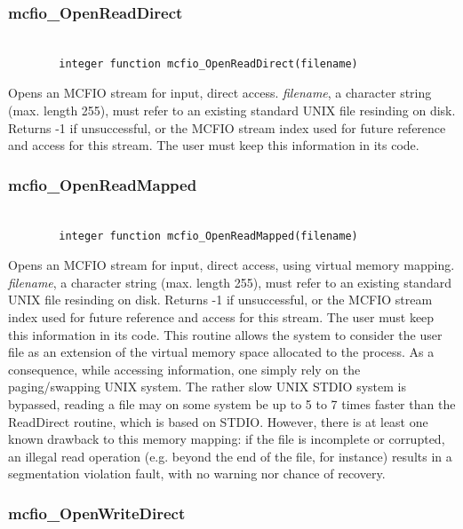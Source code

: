 \subsubsection{mcfio\_OpenReadDirect}
\begin{verbatim}

        integer function mcfio_OpenReadDirect(filename)

\end{verbatim}
 Opens an MCFIO stream for input, direct access. {\em filename}, a  character
 string (max. length 255), must refer to an existing standard UNIX file
 resinding  on disk. Returns -1 if unsuccessful, or the MCFIO stream index
 used for future reference and access for this stream. The user must keep
 this information in its code.

\subsubsection{mcfio\_OpenReadMapped}
\begin{verbatim}

        integer function mcfio_OpenReadMapped(filename)

\end{verbatim}
 Opens an MCFIO stream for input, direct access, using virtual memory mapping.
  {\em filename}, a  character
 string (max. length 255), must refer to an existing standard UNIX file
 resinding  on disk. Returns -1 if unsuccessful, or the MCFIO stream index
 used for future reference and access for this stream. The user must keep
 this information in its code.  This routine allows the system to consider the
 user file as an extension of the virtual memory space allocated to the
 process. As a consequence, while accessing information, one simply rely on the
 paging/swapping UNIX system.  The rather slow UNIX STDIO system is bypassed,
 reading a file may on some system be up to 5 to 7 times faster than the
 ReadDirect routine, which is based on STDIO.  However, there is at least one
 known drawback to this memory mapping: if the file is incomplete or corrupted,
 an illegal read operation (e.g. beyond the end of the file, for instance)
 results in a segmentation violation fault, with no warning nor chance of
 recovery.


\subsubsection{mcfio\_OpenWriteDirect}

